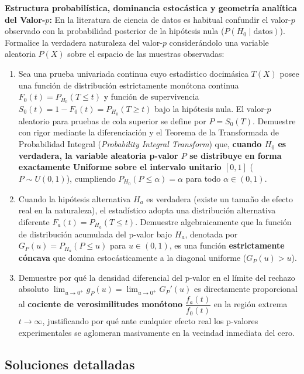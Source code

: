 \begin{problema}
	\label{prob:doc_desaf_pvalor_teorema}
	\textbf{Estructura probabilística, dominancia estocástica y geometría analítica del Valor-$p$:}
	En la literatura de ciencia de datos es habitual confundir el valor-$p$ observado con la probabilidad posterior de la hipótesis nula ($P(H_0 \mid \text{datos})$). Formalice la verdadera naturaleza del valor-$p$ considerándolo una variable aleatoria $P(X)$ sobre el espacio de las muestras observadas:
	\begin{enumerate}
		\item Sea una prueba univariada continua cuyo estadístico docimásica $T(X)$ posee una función de distribución estrictamente monótona continua $F_0(t) = P_{H_0}(T \le t)$ y función de supervivencia $S_0(t) = 1 - F_0(t) = P_{H_0}(T \ge t)$ bajo la hipótesis nula. El valor-$p$ aleatorio para pruebas de cola superior se define por $P = S_0(T)$.
		Demuestre con rigor mediante la diferenciación y el Teorema de la Transformada de Probabilidad Integral (\emph{Probability Integral Transform}) que, \textbf{cuando $H_0$ es verdadera, la variable aleatoria p-valor $P$ se distribuye en forma exactamente Uniforme sobre el intervalo unitario $[0, 1]$} ($P \sim U(0,1)$), cumpliendo $P_{H_0}(P \le \alpha) = \alpha$ para todo $\alpha \in (0,1)$.
		\item Cuando la hipótesis alternativa $H_a$ es verdadera (existe un tamaño de efecto real en la naturaleza), el estadístico adopta una distribución alternativa diferente $F_a(t) = P_{H_a}(T \le t)$. Demuestre algebraicamente que la función de distribución acumulada del p-valor bajo $H_a$, denotada por $G_P(u) = P_{H_a}(P \le u)$ para $u \in (0,1)$, es una función \textbf{estrictamente cóncava} que domina estocásticamente a la diagonal uniforme ($G_P(u) > u$).
		\item Demuestre por qué la densidad diferencial del p-valor en el límite del rechazo absoluto $\lim_{u \to 0^+} g_P(u) = \lim_{u \to 0^+} G_P'(u)$ es directamente proporcional al \textbf{cociente de verosimilitudes monótono} $\dfrac{f_a(t)}{f_0(t)}$ en la región extrema $t \to \infty$, justificando por qué ante cualquier efecto real los p-valores experimentales se aglomeran masivamente en la vecindad inmediata del cero.
	\end{enumerate}
\end{problema}


\subsection{Soluciones detalladas}

